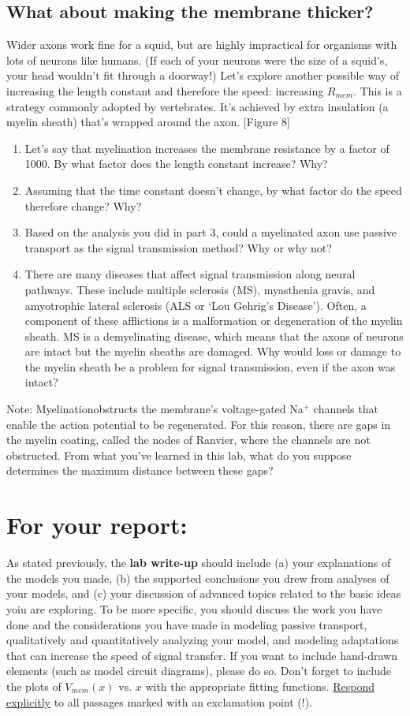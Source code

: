 \subsection*{What about making the membrane thicker?}
Wider axons work fine for a squid, but are highly impractical for organisms with lots of neurons like humans.
(If each of your neurons were the size of a squid's, your head wouldn't fit through a doorway!)
Let's explore another possible way of increasing the length constant and therefore the speed: increasing $R_{mem}$.
This is a strategy commonly adopted by vertebrates.
It's achieved by extra insulation (a myelin sheath) that's wrapped around the axon. [Figure 8]
\begin{enumerate}
\itemsep-0.2em
\item Let's say that myelination increases the membrane resistance by a factor of 1000. By what factor does the length constant increase? Why?
\item Assuming that the time constant doesn't change, by what factor do the speed therefore change? Why?
\item Based on the analysis you did in part 3, could a myelinated axon use passive transport as the signal transmission method? Why or why not?
\item There are many diseases that affect signal transmission along neural pathways. These include multiple sclerosis (MS), myasthenia gravis, and amyotrophic lateral sclerosis (ALS or `Lou Gehrig's Disease'). Often, a component of these afflictions is a malformation or degeneration of the myelin sheath. MS is a demyelinating disease, which means that the axons of neurons are intact but the myelin sheaths are damaged. Why would loss or damage to the myelin sheath be a problem for signal transmission, even if the axon was intact?
\end{enumerate}
Note: Myelinationobstructs the membrane's voltage-gated Na$^{+}$ channels that enable the action potential to be regenerated.
For this reason, there are gaps in the myelin coating, called the nodes of Ranvier, where the channels are not obstructed.
From what you've learned in this lab, what do you suppose determines the maximum distance between these gaps?

\section*{For your report:}
As stated previously, the \textbf{lab write-up} should include (a) your explanations of the models you made, (b) the supported conclusions you drew from analyses of your models, and (c) your discussion of advanced topics related to the basic ideas yoiu are exploring.
To be more specific, you should discuss the work you have done and the considerations you have made in modeling passive transport, qualitatively and quantitatively analyzing your model, and modeling adaptations that can increase the speed of signal transfer.
If you want to include hand-drawn elements (such as model circuit diagrams), please do so.
Don't forget to include the plots of $V_{mem}(x)$ vs. $x$ with the appropriate fitting functions. 
\underline{Respond explicitly} to all passages marked with an exclamation point (!).
